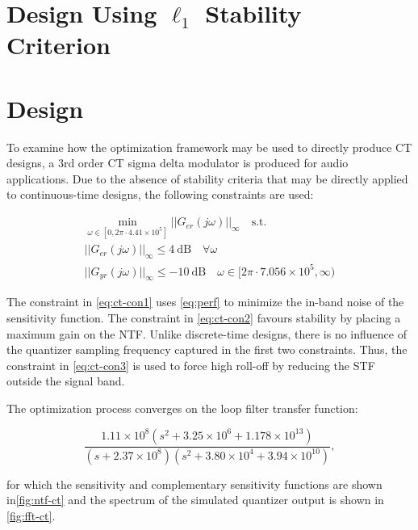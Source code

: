 \section{Design Using $\ell_1$ Stability Criterion}
\label{sec:ex-l1}

\section{ Design}
\label{sec:ex-ct}

To examine how the optimization framework may be used to directly produce \gls{CT} designs, a 3rd order \gls{CT} sigma delta modulator is produced for audio applications. Due to the absence of stability criteria that may be directly applied to continuous-time designs, the following constraints are used:

\begin{gather}
	\min_{\omega \in [0, 2\pi\cdot4.41\times10^5]} ||G_{er}(j\omega)||_\infty \quad \textrm{s.t.} \label{eq:ct-con1} \\
	||G_{er}(j\omega)||_\infty \leq \SI{4}{\deci\bel} \quad \forall \omega \label{eq:ct-con2} \\
	||G_{yr}(j\omega)||_\infty \leq \SI{-10}{\deci\bel} \quad \omega \in [2\pi\cdot7.056\times10^5, \infty) \label{eq:ct-con3}
\end{gather}

The constraint in \autoref{eq:ct-con1} uses \autoref{eq:perf} to minimize the in-band noise of the sensitivity function. The constraint in \autoref{eq:ct-con2} favours stability by placing a maximum gain on the \gls{NTF}. Unlike discrete-time designs, there is no influence of the quantizer sampling frequency captured in the first two constraints. Thus, the constraint in \autoref{eq:ct-con3} is used to force high roll-off by reducing the \gls{STF} outside the signal band.

The optimization process converges on the loop filter transfer function:

\begin{equation*}
	\frac{1.11\times10^8\left(s^2 + 3.25\times10^6 + 1.178\times10^{13}\right)}{\left(s + 2.37\times10^8\right)\left(s^2 + 3.80\times10^4 + 3.94\times10^{10}\right)},
\end{equation*}

for which the sensitivity and complementary sensitivity functions are shown in\autoref{fig:ntf-ct} and the spectrum of the simulated quantizer output is shown in \autoref{fig:fft-ct}.

